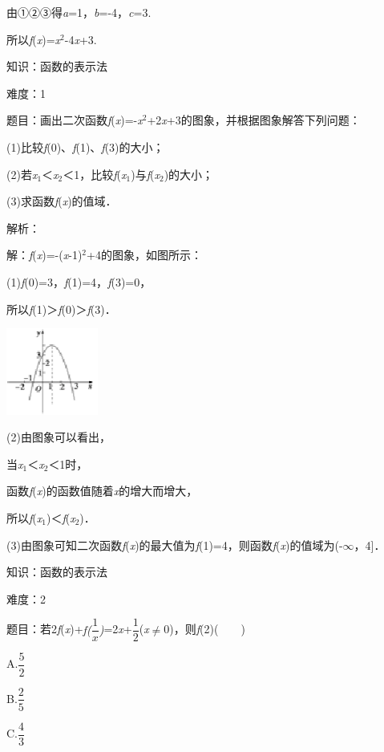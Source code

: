 \documentclass{article} %
\begin{document}
由①②③得\textit{a}=1，\textit{b}=-4，\textit{c}=3.

所以\textit{f}(\textit{x})=\textit{x}${}^{2}$-4\textit{x}+3.

知识：函数的表示法

难度：1

题目：画出二次函数\textit{f}(\textit{x})=-\textit{x}${}^{2}$+2\textit{x}+3的图象，并根据图象解答下列问题：

(1)比较\textit{f}(0)、\textit{f}(1)、\textit{f}(3)的大小；

(2)若\textit{x}${}_{1}$＜\textit{x}${}_{2}$＜1，比较\textit{f}(\textit{x}${}_{1}$)与\textit{f}(\textit{x}${}_{2}$)的大小；

(3)求函数\textit{f}(\textit{x})的值域．

解析：

解：\textit{f}(\textit{x})=-(\textit{x}-1)${}^{2}$+4的图象，如图所示：

(1)\textit{f}(0)=3，\textit{f}(1)=4，\textit{f}(3)=0，

所以\textit{f}(1)＞\textit{f}(0)＞\textit{f}(3)．

\includegraphics*[width=1.19in, height=1.12in, keepaspectratio=false]{image27}

(2)由图象可以看出，

当\textit{x}${}_{1}$＜\textit{x}${}_{2}$＜1时，

函数\textit{f}(\textit{x})的函数值随着\textit{x}的增大而增大，

所以\textit{f}(\textit{x}${}_{1}$)＜\textit{f}(\textit{x}${}_{2}$)．

(3)由图象可知二次函数\textit{f}(\textit{x})的最大值为\textit{f}(1)=4，则函数\textit{f}(\textit{x})的值域为(-$\mathrm{\infty}$，4]．

知识：函数的表示法

难度：2

题目：若2\textit{f}(\textit{x})+\textit{f($\dfrac{1}{x}$)}=2\textit{x}+$\dfrac{1}{2}$(\textit{x}$\mathrm{\neq}$0)，则\textit{f}(2)(　　)

A.$\dfrac{5}{2}$　　　

B.$\dfrac{2}{5}$　　　　　　　

C.$\dfrac{4}{3}$　　　　　
\end{document}
